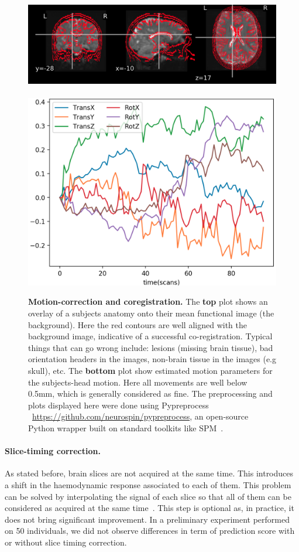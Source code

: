 \begin{figure}[!htpb]
  \includegraphics[width=1\linewidth]{figures/coreg.png}\\\\
  \includegraphics[width=1\linewidth]{figures/mc.png}
  \caption{\textbf{Motion-correction and coregistration.} The \textbf{top} plot shows an overlay of a subjects anatomy onto their mean functional image (the background). Here the red contours are well aligned with the background image, indicative of a successful co-registration. Typical things that can go wrong include: lesions (missing brain tissue), bad orientation headers in the images, non-brain tissue in the images (e.g skull), etc. The \textbf{bottom} plot show estimated motion parameters for the subjects-head motion. Here all movements are well below 0.5mm, which is generally considered as fine. The preprocessing and plots displayed here were done using Pypreprocess ~\url{https://github.com/neurospin/pypreprocess}, an open-source Python wrapper built on standard toolkits like SPM~\citep{friston1994statistical}.}
\end{figure}

\paragraph{Slice-timing correction.}
As stated before, brain slices are not acquired
at the same time. This introduces a shift in the haemodynamic response
associated to each of them. This problem can be solved by interpolating the
signal of each slice so that all of them can be considered as acquired at the
same time~\citep{henson1999slice}. This step is optional as, in practice, it does not bring significant
improvement. In a preliminary experiment performed on 50 individuals, we
did not observe differences in term of prediction score with or without slice
timing correction.

